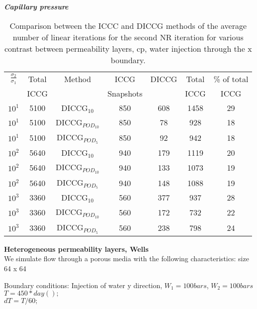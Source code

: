 \documentclass[a4paper,10pt]{report}
\begin{document}
\emph{\textbf{Capillary pressure}}
\begin{table}[!ht]\centering
\begin{minipage}{1\textwidth}
 \centering
\begin{tabular}{ ||c|c||c|c|c|c|c||} 
\hline
$\frac{\sigma_2}{\sigma_1}$&Total&Method  & ICCG&DICCG &Total&\% of total\\ 
& ICCG     &  & Snapshots& &ICCG& ICCG\\ 
\hline 
$10^{1}$ &5100& DICCG$_{10}$&850&608&1458&29\\ 
\hline  
$10^{1}$ &5100& DICCG$_{POD_{10}}$&850&78&928&18 \\ 
\hline  
$10^{1}$ &5100& DICCG$_{POD_{5}}$&850&92&942&18 \\ 
\hline                           
$10^{2}$ &5640& DICCG$_{10}$&940&179&1119&20\\ 
\hline  
$10^{2}$ &5640& DICCG$_{POD_{10}}$&940&133&1073&19 \\ 
\hline  
$10^{2}$ &5640& DICCG$_{POD_{5}}$&940&148&1088&19 \\ 
\hline  
 $10^{3}$ &3360& DICCG$_{10}$&560&377&937&28\\ 
\hline  
$10^{3}$ &3360& DICCG$_{POD_{10}}$&560&172&732&22 \\ 
\hline  
$10^{3}$ &3360& DICCG$_{POD_{5}}$&560&238&798&24 \\ 
\hline  
\end{tabular} 
\caption{Comparison between the ICCC and DICCG methods of the average number of linear iterations for the second NR iteration for various contrast between permeability layers, cp, water injection through the x boundary. }\label{table:litertot2} 
\end{minipage}  
\end{table}  

\textbf{Heterogeneous permeability layers, Wells}\\
We simulate flow through a porous media with the following characteristics:
size 64 x 64

Boundary conditions:
Injection of water y direction, $W_{1}=100 bars$, $W_2=100bars$\\
$T      = 450*day();$  \\  
$dT     = T/60;$\\
\end{document}
